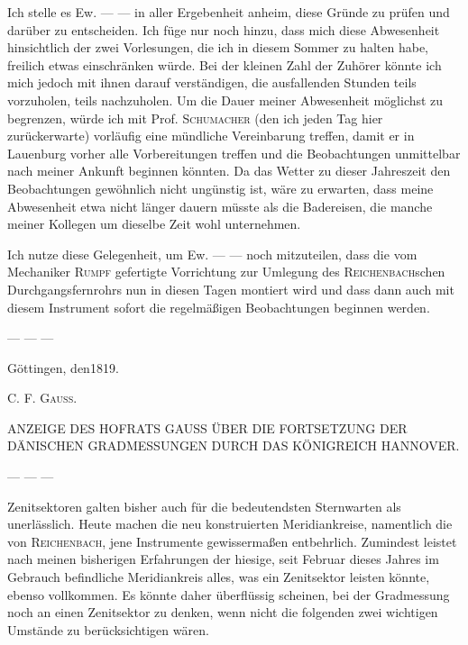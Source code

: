 \par
{}%
Ich stelle es Ew. — — in aller Ergebenheit anheim, diese Gründe zu prüfen und darüber zu entscheiden. Ich füge nur noch hinzu, dass mich diese Abwesenheit hinsichtlich der zwei Vorlesungen, die ich in diesem Sommer zu halten habe, freilich etwas einschränken würde. Bei der kleinen Zahl der Zuhörer könnte ich mich jedoch mit ihnen darauf verständigen, die ausfallenden Stunden teils vorzuholen, teils nachzuholen. Um die Dauer meiner Abwesenheit möglichst zu begrenzen, würde ich mit Prof. \textsc{Schumacher} (den ich jeden Tag hier zurückerwarte) vorläufig eine mündliche Vereinbarung treffen, damit er in Lauenburg vorher alle Vorbereitungen treffen und die Beobachtungen unmittelbar nach meiner Ankunft beginnen könnten. Da das Wetter zu dieser Jahreszeit den Beobachtungen gewöhnlich nicht ungünstig ist, wäre zu erwarten, dass meine Abwesenheit etwa nicht länger dauern müsste als die Badereisen, die manche meiner Kollegen um dieselbe Zeit wohl unternehmen.

Ich nutze diese Gelegenheit, um Ew. — — noch mitzuteilen, dass die vom Mechaniker \textsc{Rumpf} gefertigte Vorrichtung zur Umlegung des \textsc{Reichenbach}schen Durchgangsfernrohrs nun in diesen Tagen montiert wird und dass dann auch mit diesem Instrument sofort die regelmäßigen Beobachtungen beginnen werden.

— — —

Göttingen, den\hspace{3em}1819.
\begin{flushright}C. F. \textsc{Gauss}.\end{flushright}

\par\bigskip
{}
\begin{center}\large ANZEIGE DES HOFRATS GAUSS ÜBER DIE FORTSETZUNG DER DÄNISCHEN GRADMESSUNGEN DURCH DAS KÖNIGREICH HANNOVER.\end{center}
\par
— — —

Zenitsektoren galten bisher auch für die bedeutendsten Sternwarten als unerlässlich. Heute machen die neu konstruierten Meridiankreise, namentlich die von \textsc{Reichenbach}, jene Instrumente gewissermaßen entbehrlich. Zumindest leistet nach meinen bisherigen Erfahrungen der hiesige, seit Februar dieses Jahres im Gebrauch befindliche Meridiankreis alles, was ein Zenitsektor leisten könnte, ebenso vollkommen. Es könnte daher überflüssig scheinen, bei der Gradmessung noch an einen Zenitsektor zu denken, wenn nicht die folgenden zwei wichtigen Umstände zu berücksichtigen wären.

